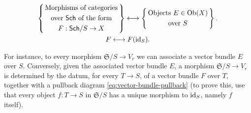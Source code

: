\documentclass[12pt]{memoir}
\begin{document}
\begin{ptcb}
\begin{gather*}
        \left\{\,\begin{gathered}
            \text{Morphisms of categories}\\
            \text{over }\mathsf{Sch}\text{ of the form}\\
            F:\mathsf{Sch}/S\to X
        \end{gathered}\,\right\}
        \longleftrightarrow
        \left\{\,\begin{gathered}
            \text{Objects }E\in\operatorname{Ob}(X)\\
            \text{over }S
        \end{gathered}\,\right\}.\\
    F\longleftrightarrow F(\operatorname{id}_S).
    \end{gather*}
    \endgroup
\end{ptcb}

\begin{nonum-Ex}
    For instance, to every morphism $\mathfrak{S}/S \to V_r$ we can associate a vector bundle $E$ over $S$. Conversely, given the associated vector bundle $E$, a morphism $\mathfrak{S}/S \to V_r$ is determined by the datum, for every $T \to S$, of a vector bundle $F$ over $T$, together with a pullback diagram \eqref{eq:vector-bundle-pullback} (to prove this, use that every object $f\colon T \to S$ in $\mathfrak{S}/S$ has a unique morphism to $\operatorname{id}_S$, namely $f$ itself).
\end{nonum-Ex}
\end{document}
